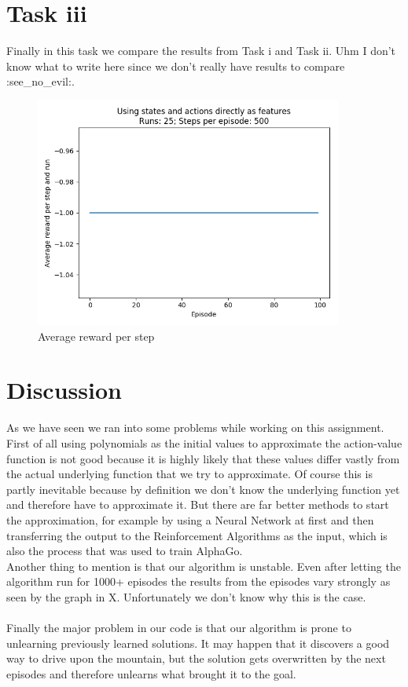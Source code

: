 \documentclass{article}
\begin{document}
	
	\section{Task iii}
	Finally in this task we compare the results from Task i and Task ii. Uhm I don't know what to write here since we don't really have results to compare :see\_no\_evil:.
	
	\begin{figure}[h]
		\caption{Average reward per step}
		\label{fig:AverageReward}
		\includegraphics[width=0.9\textwidth]{plots/averageReward.png}
	\end{figure}
	
	
	\section{Discussion}
	As we have seen we ran into some problems while working on this assignment. First of all using polynomials as the initial values to approximate the action-value function is not good because it is highly likely that these values differ vastly from the actual underlying function that we try to approximate. Of course this is partly inevitable because by definition we don't know the underlying function yet and therefore have to approximate it. But there are far better methods to start the approximation, for example by using a Neural Network at first and then transferring the output to the Reinforcement Algorithms as the input, which is also the process that was used to train AlphaGo. 
	\\
	Another thing to mention is that our algorithm is unstable. Even after letting the algorithm run for 1000+ episodes the results from the episodes vary strongly as seen by the graph in X. Unfortunately we don't know why this is the case. \\
	\\
	Finally the major problem in our code is that our algorithm is prone to unlearning previously learned solutions. It may happen that it discovers a good way to drive upon the mountain, but the solution gets overwritten by the next episodes and therefore unlearns what brought it to the goal. 
	
	
	
	
	
	
\end{document}
